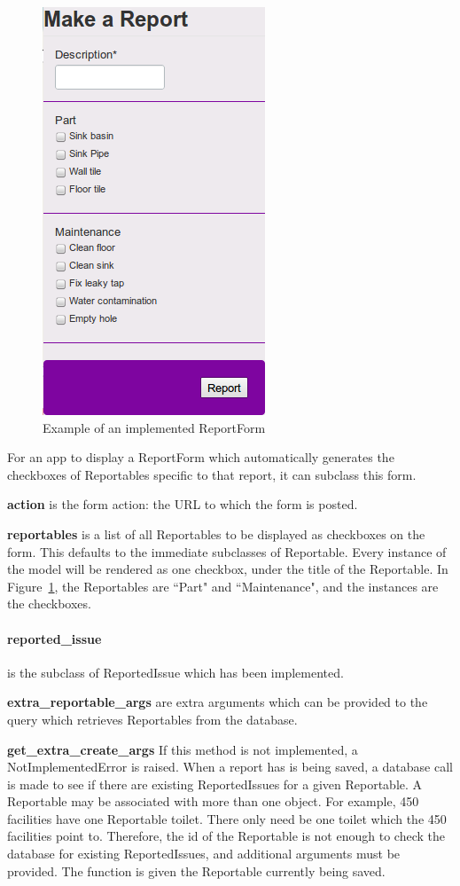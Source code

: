 \begin{figure}
\centering
\includegraphics[scale=0.4]{img/reportform.png}
\caption{Example of an implemented ReportForm}
\label{fig:rm:reportform}
\end{figure}

For an app to display a ReportForm which automatically generates the checkboxes of Reportables specific to that report, it can subclass this form.

\textbf{action} is the form action: the URL to which the form is posted.

\textbf{reportables} is a list of all Reportables to be displayed as checkboxes on the form. This defaults to the immediate subclasses of Reportable. Every instance of the model will be rendered as one checkbox, under the title of the Reportable. In Figure~\ref{fig:rm:reportform}, the Reportables are ``Part" and ``Maintenance", and the instances are the checkboxes.

\paragraph{reported\_issue} is the subclass of ReportedIssue which has been implemented.

\textbf{extra\_reportable\_args} are extra arguments which can be provided to the query which retrieves Reportables from the database.

\textbf{get\_extra\_create\_args} If this method is not implemented, a NotImplementedError is raised. When a report has is being saved, a database call is made to see if there are existing ReportedIssues for a given Reportable. A Reportable may be associated with more than one object. For example, 450 facilities have one Reportable toilet. There only need be one toilet which the 450 facilities point to. Therefore, the id of the Reportable is not enough to check the database for existing ReportedIssues, and additional arguments must be provided. The function is given the Reportable currently being saved.

